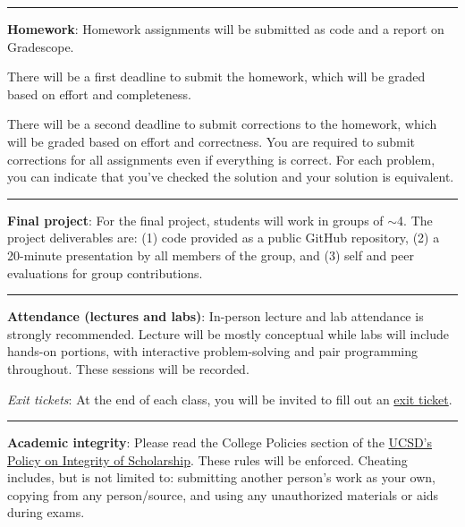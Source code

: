 \documentclass[12pt]{article}
\begin{document}
\begin{center}
  \rule{\textwidth}{0.5pt}
\end{center}


\noindent\textbf{Homework}: Homework assignments will be submitted as code and a report on Gradescope.

There will be a first deadline to submit the homework, which will be graded based on effort and completeness.

There will be a second deadline to submit corrections to the homework, which will be graded based on effort and correctness.
You are required to submit corrections for all assignments even if everything is correct.
For each problem, you can indicate that you've checked the solution and your solution is equivalent.

\begin{center}
  \rule{\textwidth}{0.5pt}
\end{center}

\noindent\textbf{Final project}:
For the final project, students will work in groups of $\sim$4.
The project deliverables are: (1) code provided as a public GitHub repository, (2) a 20-minute presentation by all members of the group, and (3) self and peer evaluations for group contributions.

\begin{center}
  \rule{\textwidth}{0.5pt}
\end{center}

\noindent\textbf{Attendance (lectures and labs)}: In-person lecture and lab attendance is strongly recommended.
Lecture will be mostly conceptual while labs will include hands-on portions, with interactive problem-solving and pair programming throughout.
These sessions will be recorded.

\emph{Exit tickets}: At the end of each class, you will be invited to fill out an \href{https://forms.gle/opY7EFZJiRBgkMsAA}{exit ticket}.

\begin{center}
  \rule{\textwidth}{0.5pt}
\end{center}

\noindent\textbf{Academic integrity}: Please read the College Policies section of the \href{http://senate.ucsd.edu/Operating-Procedures/Senate-Manual/Appendices/2}{UCSD's Policy on Integrity of Scholarship}.
These rules will be enforced.
Cheating includes, but is not limited to: submitting another person's work as your own, copying from any person/source, and using any unauthorized materials or aids during exams.
\end{document}
